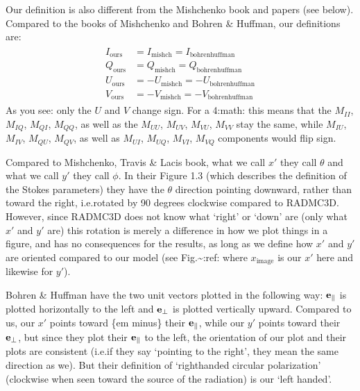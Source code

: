 \documentclass[letterpaper,10pt,english]{sphinxmanual}
\begin{document}
Our definition is also different from the Mishchenko book and papers (see
below). Compared to the books of Mishchenko and Bohren \& Huffman, our
definitions are:
\begin{equation*}
\begin{split}\begin{split}
I_{\mathrm{ours}} &=  I_{\mathrm{mishch}}  = I_{\mathrm{bohrenhuffman}} \\
Q_{\mathrm{ours}} &=  Q_{\mathrm{mishch}}  = Q_{\mathrm{bohrenhuffman}} \\
U_{\mathrm{ours}} &=  -U_{\mathrm{mishch}} = -U_{\mathrm{bohrenhuffman}} \\
V_{\mathrm{ours}} &=  -V_{\mathrm{mishch}} = -V_{\mathrm{bohrenhuffman}}
\end{split}\end{split}
\end{equation*}
As you see: only the \(U\) and \(V\) change sign. For a 4:math: this means that the \(M_{II}\), \(M_{IQ}\),
\(M_{QI}\), \(M_{QQ}\), as well as the \(M_{UU}\), \(M_{UV}\),
\(M_{VU}\), \(M_{VV}\) stay the same, while \(M_{IU}\),
\(M_{IV}\), \(M_{QU}\), \(M_{QV}\), as well as \(M_{UI}\),
\(M_{UQ}\), \(M_{VI}\), \(M_{VQ}\) components would flip sign.

Compared to Mishchenko, Travis \& Lacis book, what we call \(x'\) they call
\(\theta\) and what we call \(y'\) they call \(\phi\). In their
Figure 1.3 (which describes the definition of the Stokes parameters) they have
the \(\theta\) direction pointing downward, rather than toward the right,
i.e.rotated by 90 degrees clockwise compared to RADMC\sphinxhyphen{}3D. However, since
RADMC\sphinxhyphen{}3D does not know what ‘right’ or ‘down’ are (only what \(x'\) and
\(y'\) are) this rotation is merely a difference in how we plot things in a
figure, and has no consequences for the results, as long as we define how
\(x'\) and \(y'\) are oriented compared to our model (see
Fig.\textasciitilde{}:ref: where \(x_{\mathrm{image}}\) is our \(x'\)
here and likewise for \(y'\)).

Bohren \& Huffman have the two unit vectors plotted in the following way:
\({\bf e}_{\parallel}\) is plotted horizontally to the left and \({\bf
e}_{\perp}\) is plotted vertically upward. Compared to us, our \(x'\) points
toward \{em minus\} their \({\bf e}_{\parallel}\), while our \(y'\)
points toward their \({\bf e}_{\perp}\), but since they plot their
\({\bf e}_{\parallel}\) to the left, the orientation of our plot and their
plots are consistent (i.e.if they say ‘pointing to the right’, they mean the
same direction as we). But their definition of ‘right\sphinxhyphen{}handed circular
polarization’ (clockwise when seen toward the source of the radiation) is our
‘left handed’.
\end{document}
